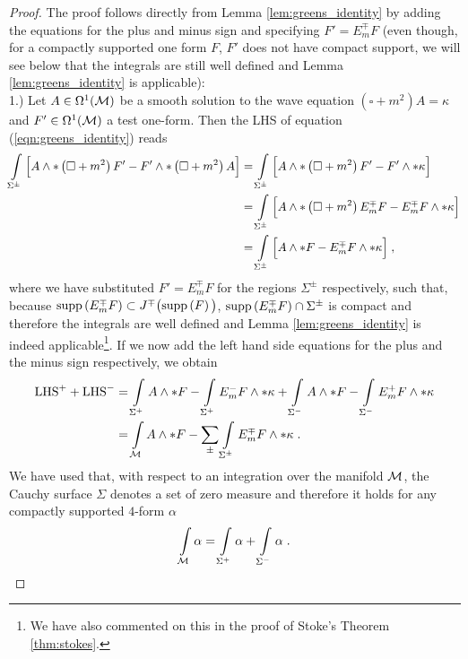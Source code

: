 %
%
\begin{proof}
The proof follows directly from Lemma \ref{lem:greens_identity} by adding the equations for the plus and minus sign and specifying $F ' = E_m^\mp F $ (even though, for a compactly supported one form $F $,  $F '$ does not have compact support, we will see below that the integrals are still well defined and Lemma \ref{lem:greens_identity} is applicable): \\
1.) Let $A\in \Omega^1(\mathcal{M})$ be a smooth solution to the wave equation $(\square + m^2)A = \kappa$ and $F ' \in \Omega^1(\mathcal{M})$ a test one-form. Then the LHS of equation (\ref{eqn:greens_identity}) reads
\begin{align}
 \int\limits_{\Sigma^\pm} \Big[ A \wedge * \left( \square + m^2 \right) F ' - F ' \wedge * \left( \square + m^2 \right) A \Big]
&=  \int\limits_{\Sigma^\pm} \Big[ A \wedge * \left( \square + m^2 \right) F ' - F ' \wedge * \kappa \Big] \notag \\
&= \int\limits_{\Sigma^\pm} \Big[ A \wedge * \left( \square + m^2 \right) E_m^\mp F - E_m^\mp F \wedge * \kappa \Big]  \notag \\
&= \int\limits_{\Sigma^\pm} \Big[ A \wedge *F - E_m^\mp F \wedge * \kappa \Big]  \;,
\end{align}
where we have  substituted $F ' = E_m^\mp F $ for the regions $\Sigma^\pm$ respectively, such that, because $\text{\upshape{supp}}\left(E_m^\mp F \right) \subset J^\mp\big(  \text{\upshape{supp}}\left(F \right)\big)$, $\text{\upshape{supp}}\left(E_m^\mp F \right) \cap \Sigma^\pm$ is compact  and therefore the integrals are well defined and Lemma \ref{lem:greens_identity} is indeed applicable\footnote{ We have also commented on this in the proof of Stoke's Theorem \ref{thm:stokes}.}. If we now add the left hand side equations for the plus and the minus sign respectively, we obtain
\begin{align}
\textrm{LHS}^+ + \textrm{LHS}^- &= \int\limits_{\Sigma^+}  A \wedge *F
- \int\limits_{\Sigma^+}  E_m^- F \wedge * \kappa
+\int\limits_{\Sigma^-}  A \wedge *F
- \int\limits_{\Sigma^-}  E_m^+ F \wedge * \kappa \notag \\
&= \int\limits_{\mathcal{M}}  A \wedge *F - \sum\limits_\pm \int\limits_{\Sigma^\pm}  E_m^\mp F \wedge * \kappa \;.
\end{align}
We have used that, with respect to an integration over the manifold $\mathcal{M}$, the Cauchy surface $\Sigma$ denotes a set of zero measure and therefore it holds for any compactly supported $4$-form $\alpha$
\begin{align}
\int \limits_{\M} \alpha = \int \limits_{\Sigma^+} \alpha  + \int\limits_{\Sigma^-} \alpha \formspace.

\end{align}
\end{proof}
